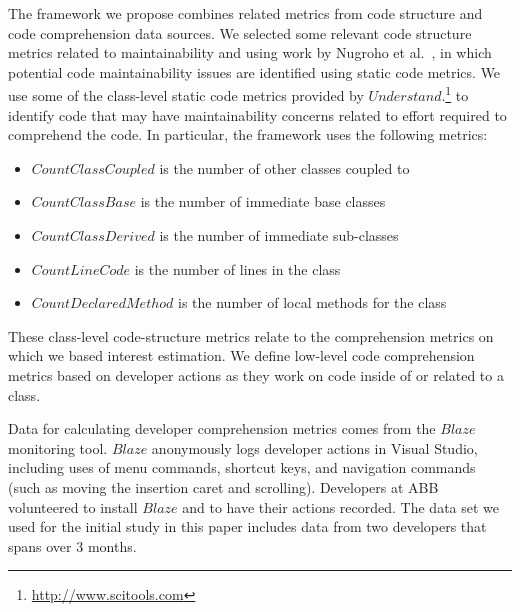 
The framework we propose combines related metrics from code structure and code comprehension data sources.  We selected some relevant code structure metrics related to maintainability and \TD using work by Nugroho et al.~\cite{Nugroho_etal:2011}, in which potential code maintainability issues are identified using static code metrics.  We use some of the class-level static code metrics provided by $Understand$.\footnote{\url{http://www.scitools.com}} to identify code that may have maintainability concerns related to effort required to comprehend the code. In particular, the framework uses the following metrics:
\begin{itemize}
    \item[] $Count Class Coupled$ is the number of other classes coupled to
    \item[] $Count Class Base$ is the number of immediate base classes
    \item[] $Count Class Derived$ is the number of immediate sub-classes
    \item[] $Count Line Code$ is the number of lines in the class
    \item[] $Count Declared Method$ is the number of local methods for the class
\end{itemize}

These class-level code-structure metrics relate to the comprehension metrics on which we based interest estimation. We define low-level code comprehension metrics based on developer actions as they work on code inside of or related to a class.

Data for calculating developer comprehension metrics comes from the $Blaze$~\cite{Snipes_etal:2014} monitoring tool.  $Blaze$ anonymously logs developer actions in Visual Studio, including uses of menu commands, shortcut keys, and navigation commands (such as moving the insertion caret and scrolling).  Developers at ABB volunteered to install $Blaze$ and to have their actions recorded.  The data set we used for the initial study in this paper includes data from two developers that spans over 3 months.

